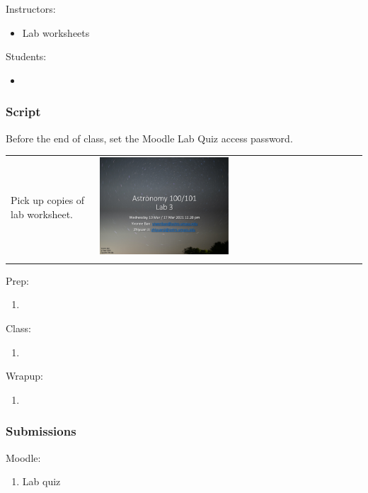 \documentclass[12pt]{article}
\begin{document}
Instructors:
\begin{itemize}
\item Lab worksheets
\end{itemize}

\noindent
Students:
\begin{itemize}
\item 
\end{itemize}


\subsubsection{Script}

Before the end of class, set the Moodle Lab Quiz access password.

\begin{longtable}{m{}m{}}
Pick up copies of lab worksheet. & \includegraphics[width=0.5\textwidth]{ppt/lab07/Slide1.jpeg}\\

\label{default}
\end{longtable}

Prep:
\begin{enumerate}
\item
\end{enumerate}

\noindent
Class:
\begin{enumerate}
\item
\end{enumerate}

\noindent
Wrapup:
\begin{enumerate}
\item
\end{enumerate}


\subsubsection{Submissions}

Moodle:
\begin{enumerate}
\item Lab quiz
\end{enumerate}
\end{document}
